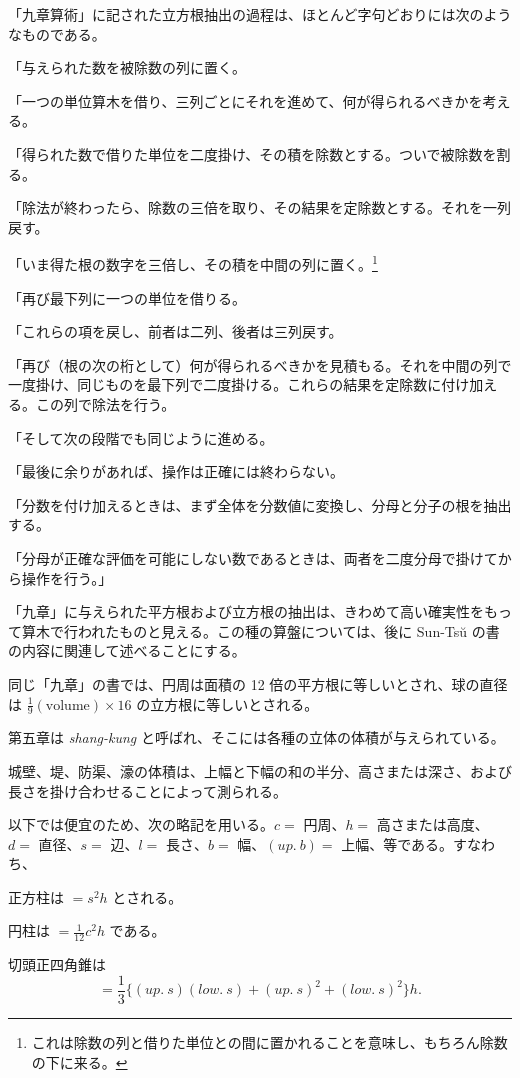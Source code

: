 \documentclass[11pt]{article}
\newcommand{\scanpage}[2]{\clearpage\setcounter{footnote}{0}\noindent{\footnotesize\color{gray}PDF #1 頁 · #2}\par\medskip}
\newcommand{\scanfooter}{}
\begin{document}
「九章算術」に記された立方根抽出の過程は、ほとんど字句どおりには次のようなものである。

「与えられた数を被除数の列に置く。

「一つの単位算木を借り、三列ごとにそれを進めて、何が得られるべきかを考える。

「得られた数で借りた単位を二度掛け、その積を除数とする。ついで被除数を割る。

「除法が終わったら、除数の三倍を取り、その結果を定除数とする。それを一列戻す。

「いま得た根の数字を三倍し、その積を中間の列に置く。\footnote{これは除数の列と借りた単位との間に置かれることを意味し、もちろん除数の下に来る。}

「再び最下列に一つの単位を借りる。

「これらの項を戻し、前者は二列、後者は三列戻す。

「再び（根の次の桁として）何が得られるべきかを見積もる。それを中間の列で一度掛け、同じものを最下列で二度掛ける。これらの結果を定除数に付け加える。この列で除法を行う。

「そして次の段階でも同じように進める。

「最後に余りがあれば、操作は正確には終わらない。

「分数を付け加えるときは、まず全体を分数値に変換し、分母と分子の根を抽出する。

「分母が正確な評価を可能にしない数であるときは、両者を二度分母で掛けてから操作を行う。」

「九章」に与えられた平方根および立方根の抽出は、きわめて高い確実性をもって算木で行われたものと見える。この種の算盤については、後に Sun-Tsŭ の書の内容に関連して述べることにする。

同じ「九章」の書では、円周は面積の 12 倍の平方根に等しいとされ、球の直径は $\frac19(\text{volume})\times 16$ の立方根に等しいとされる。
\scanfooter

\scanpage{0029}{第三章、印刷頁15}
第五章は \emph{shang-kung} と呼ばれ、そこには各種の立体の体積が与えられている。

城壁、堤、防渠、濠の体積は、上幅と下幅の和の半分、高さまたは深さ、および長さを掛け合わせることによって測られる。

以下では便宜のため、次の略記を用いる。$c=$ 円周、$h=$ 高さまたは高度、$d=$ 直径、$s=$ 辺、$l=$ 長さ、$b=$ 幅、$(up.\ b)=$ 上幅、等である。すなわち、

正方柱は $=s^2h$ とされる。

円柱は $=\frac1{12}c^2h$ である。

切頭正四角錐は
\[
=\frac13\{(up.\ s)(low.\ s)+(up.\ s)^2+(low.\ s)^2\}h.
\]
\end{document}

